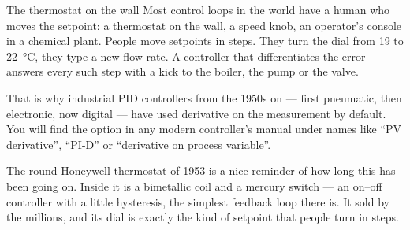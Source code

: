 \begin{curiosity}{The thermostat on the wall}
Most control loops in the world have a human who moves the setpoint: a thermostat on the wall, a speed knob, an operator's console in a chemical plant. People move setpoints in steps. They turn the dial from 19 to \SI{22}{\celsius}, they type a new flow rate. A controller that differentiates the error answers every such step with a kick to the boiler, the pump or the valve.

That is why industrial PID controllers from the 1950s on — first pneumatic, then electronic, now digital — have used derivative on the measurement by default. You will find the option in any modern controller's manual under names like \enquote{PV derivative}, \enquote{PI-D} or \enquote{derivative on process variable}.

The round Honeywell thermostat of 1953 is a nice reminder of how long this has been going on. Inside it is a bimetallic coil and a mercury switch — an on–off controller with a little hysteresis, the simplest feedback loop there is. It sold by the millions, and its dial is exactly the kind of setpoint that people turn in steps.
\end{curiosity}

